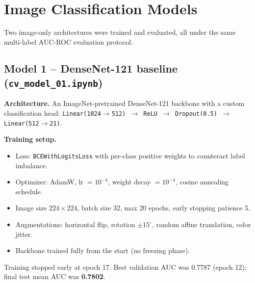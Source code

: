 \documentclass[11pt]{article}
\begin{document}
\section{Image Classification Models}
\label{sec:cv}

Two image-only architectures were trained and evaluated, all under the same
multi-label AUC-ROC evaluation protocol.

\subsection{Model 1 -- DenseNet-121 baseline (\texttt{cv\_model\_01.ipynb})}

\textbf{Architecture.} An ImageNet-pretrained DenseNet-121 backbone with a custom
classification head: \texttt{Linear(1024$\to$512) $\to$ ReLU $\to$ Dropout(0.5)
$\to$ Linear(512$\to$21)}.

\textbf{Training setup.}
\begin{itemize}
  \item Loss: \texttt{BCEWithLogitsLoss} with per-class positive weights to
        counteract label imbalance.
  \item Optimizer: AdamW, lr $=10^{-4}$, weight decay $=10^{-4}$, cosine annealing
        schedule.
  \item Image size $224\times224$, batch size 32, max 20 epochs, early stopping
        patience 5.
  \item Augmentations: horizontal flip, rotation $\pm15^\circ$, random affine
        translation, color jitter.
  \item Backbone trained fully from the start (no freezing phase).
\end{itemize}

Training stopped early at epoch 17. Best validation AUC was 0.7787 (epoch 12);
final test mean AUC was \textbf{0.7802}.
\end{document}
